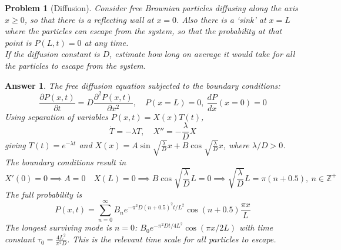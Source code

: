 \documentclass[a4paper]{article}
\theoremstyle{new2}
\newtheorem{ans}{Answer}[section]
\theoremstyle{new}
\newtheorem{qns}{Problem}[section]
\begin{document}
\newpage
\begin{qns}[Diffusion]
Consider free Brownian particles diffusing along the axis $x\geq0$, so that there is a reflecting wall at $x = 0$. Also there is a `sink' at $x = L$ where the particles can escape from the system, so that the probability at that point is $P(L,t) = 0$ at any time.\\[5pt]
If the diffusion constant is $D$, estimate how long on average it would take for all the particles to escape from the system.
\end{qns}
\begin{ans}
The free diffusion equation subjected to the boundary conditions:
$$\frac{\partial P(x,t)}{\partial t}=D\frac{\partial^2P(x,t)}{\partial x^2},\quad P(x=L)=0,~\frac{dP}{dx}(x=0)=0$$
Using separation of variables $P(x,t)=X(x)T(t)$,
$$\dot{T}=-\lambda T,\quad X''=-\frac{\lambda}{D}X$$
giving $T(t)=e^{-\lambda t}$ and $X(x)=A\sin\sqrt{\frac{\lambda}{D}}x+B\cos\sqrt{\frac{\lambda}{D}}x$, where $\lambda/D>0$. The boundary conditions result in
$$X'(0)=0\implies A=0\quad X(L)=0\implies B\cos\sqrt{\frac{\lambda}{D}}L=0\implies\sqrt{\frac{\lambda}{D}}L=\pi(n+0.5),~n\in\mathbb{Z}^+$$
The full probability is
$$P(x,t)=\sum_{n=0}^\infty B_ne^{-\pi^2D(n+0.5)^2t/L^2}\cos(n+0.5)\frac{\pi x}{L}$$
The longest surviving mode is $n=0$: $B_0e^{-\pi^2Dt/4L^2}\cos(\pi x/2L)$ with time constant $\tau_0=\frac{4L^2}{\pi^2D}$. This is the relevant time scale for all particles to escape.
\end{ans}
\end{document}
